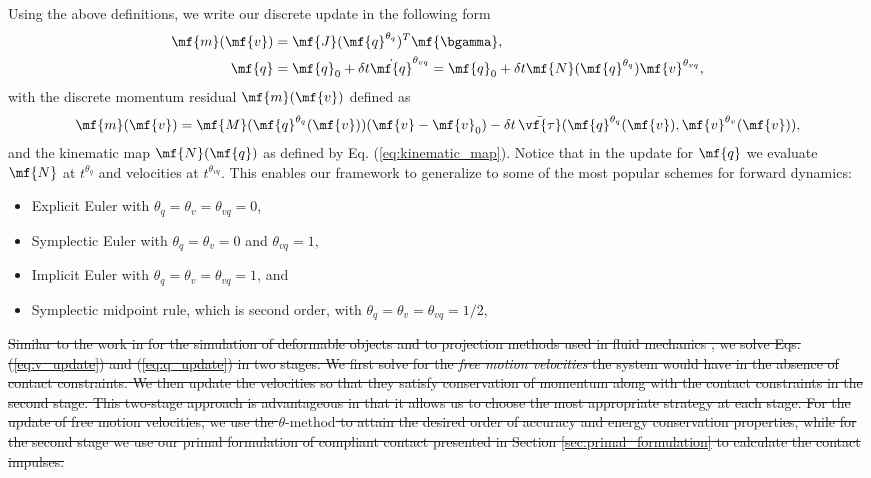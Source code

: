 Using the above definitions, we write our discrete update in the following form
\begin{align}
	\mf{m}(\mf{v}) &= \mf{J}(\mf{q}^{\theta_{q}})^T\mf{\bgamma},
	\label{eq:v_update}\\
	\mf{q} &= \mf{q}_0 + \delta t \dot{\mf{q}}^{\theta_{vq}} = \mf{q}_0 + \delta t\mf{N}(\mf{q}^{\theta_{q}})\mf{v}^{\theta_{vq}},
	\label{eq:q_update}
\end{align}
with the discrete momentum residual $\mf{m}(\mf{v})$ defined as
\begin{multline}
	\mf{m}(\mf{v}) =
	\mf{M}(\mf{q}^{\theta_{q}}(\mf{v}))(\mf{v}-\mf{v}_0) -
	\delta t\,\bar{\vf{\tau}}(\mf{q}^{\theta_{q}}(\mf{v}), \mf{v}^{\theta_v}(\mf{v})),
	\label{eq:m_definition}
\end{multline}
and the kinematic map $\mf{N}(\mf{q})$ as defined by Eq.
(\ref{eq:kinematic_map}). Notice that in the update for $\mf{q}$ we evaluate
$\mf{N}$ at $t^{\theta_{q}}$ and velocities at $t^{\theta_{vq}}$. This enables
our framework to generalize to some of the most popular schemes for forward
dynamics:
\begin{itemize}
	\item Explicit Euler with $\theta_q=\theta_{v}=\theta_{vq} = 0$,
	\item Symplectic Euler with $\theta_{q} = \theta_v = 0$ and $\theta_{vq}=1$,
	\item Implicit Euler with $\theta_{q} = \theta_v = \theta_{vq}= 1$, and
	\item Symplectic midpoint rule, which is second order, with $\theta_{q} =
	\theta_v = \theta_{vq}= 1/2$,
\end{itemize}

\sout{Similar to the work in \cite{bib:duriez2005realistic} for the simulation of
deformable objects and to projection methods used in fluid mechanics
\cite{bib::bell1991efficient}, we solve Eqs. (\ref{eq:v_update}) and
(\ref{eq:q_update}) in two stages. We first solve for the \emph{free motion
velocities} the system would have in the absence of contact constraints. We then
update the velocities so that they satisfy conservation of momentum along with
the contact constraints in the second stage. This two-stage approach is
advantageous in that it allows us to choose the most appropriate strategy at
each stage. For the update of free motion velocities, we use the
$\theta\text{-method}$ to attain the desired order of accuracy and energy
conservation properties, while for the second stage we use our primal
formulation of compliant contact presented in Section
\ref{sec:primal_formulation} to calculate the contact impulses.}

